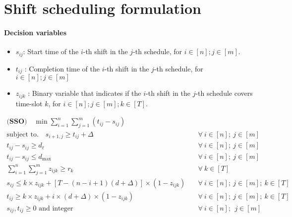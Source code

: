 \documentclass[11pt]{article}
\begin{document}
\section{Shift scheduling formulation}
\paragraph{Decision variables} 
\begin{itemize}
\item $s_{ij}$: Start time of the $i$-th shift in the $j$-th schedule, for $i \in [n]; j \in [m]$. 
\item  $t_{ij}$ : Completion time of the $i$-th shift in the $j$-th schedule, for $i \in  [n]; j \in [m]$
\item $z_{ijk}$ : Binary  variable that indicates if the $i$-th shift in the $j$-th schedule covers time-slot $k$, for $ i \in [n]; j \in [m]; k \in [T]$.
\end{itemize}
\begin{align}
\label{eq.ATCSobj}\textbf{(SSO)}\quad\min \sum_{i=1}^{n}\sum_{j=1}^{m}(t_{ij}-s_{ij}) \\
\label{eq.ATCSnextshiftcon}\text{subject to.} \quad s_{i+1,j} \ge t_{ij} + \Delta &\quad \forall \ i \in [n]; \  j \in [m]\\
\label{eq.ATCSminshiftlength}t_{ij} - s_{ij} \ge d_\ell   &\quad \forall \  i \in [n]; \  j \in [m]\\
\label{eq.ATCSmaxshiftlength}t_{ij} - s_{ij} \le d_{\max}   &\quad \forall \  i \in [n]; \  j \in [m]\\
\label{eq.ATCSdemandcon} \sum_{i=1}^{n}\sum_{j=1}^{m}z_{ijk} \ge r_k  &\quad \forall \ k \in [T]\\
\label{eq.ATCSstartb4k}s_{ij} \le k\times z_{ijk} + [T-(n-i+1)(d + \Delta)]\times(1-z_{ijk}) &\quad \forall \  i \in [n]; \  j \in [m]; \  k \in [T]\\
\label{eq.ATCSendafterk}t_{ij} \ge k\times z_{ijk} + i\times(d+\Delta)\times(1-z_{ijk}) &\quad \forall \  i \in [n]; \ j \in [m]; \  k \in [T]\\
\label{eq.ATCSNN} s_{ij}, t_{ij}  \ge 0 \text{ and integer}  &\quad \forall \ i \in [n]; \ \ j \in [m]
\end{align}



%
%
\end{document}
